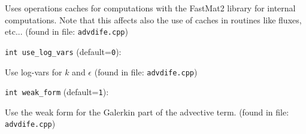 Uses operations caches for computations with the FastMat2
 library for internal computations. Note that this affects also the
 use of caches in routines like fluxes, etc...
 (found in file: \verb+advdife.cpp+)
\item\verb+int use_log_vars+ {\rm(default=\verb|0|)}:

Use log-vars for $k$ and $\epsilon$
 (found in file: \verb+advdife.cpp+)
\item\verb+int weak_form+ {\rm(default=\verb|1|)}:

Use the weak form for the Galerkin part of the advective term.
 (found in file: \verb+advdife.cpp+)
